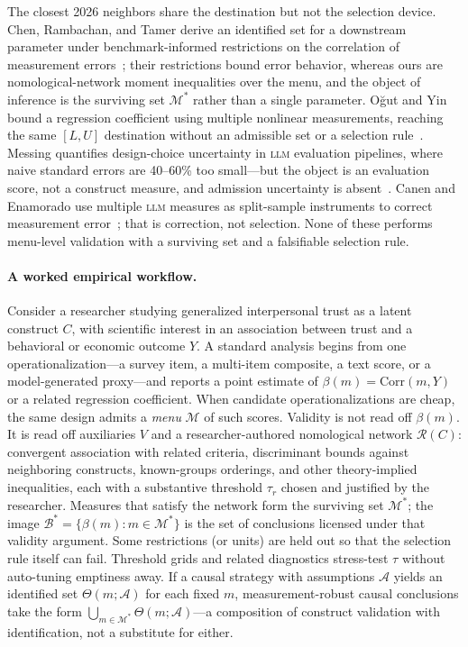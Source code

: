 \documentclass[10pt,letterpaper]{article}
\newcommand{\LLM}{\textsc{llm}}
\newcommand{\M}{\ensuremath{\mathcal{M}}}
\newcommand{\Rset}{\mathcal{R}}
\newcommand{\Bset}{\mathcal{B}}
\begin{document}
The closest 2026 neighbors share the destination but not the selection device.
Chen, Rambachan, and Tamer derive an identified set for a downstream parameter under benchmark-informed restrictions on the correlation of measurement errors~\cite{chenrttamer2026}; their restrictions bound error behavior, whereas ours are nomological-network moment inequalities over the menu, and the object of inference is the surviving set $\M^*$ rather than a single parameter.
O\u{g}ut and Yin bound a regression coefficient using multiple nonlinear measurements, reaching the same $[L,U]$ destination without an admissible set or a selection rule~\cite{ogutyin2026}.
Messing quantifies design-choice uncertainty in \LLM{} evaluation pipelines, where naive standard errors are 40--60\% too small---but the object is an evaluation score, not a construct measure, and admission uncertainty is absent~\cite{messing2026}.
Canen and Enamorado use multiple \LLM{} measures as split-sample instruments to correct measurement error~\cite{canenenamorado2026}; that is correction, not selection.
None of these performs menu-level validation with a surviving set and a falsifiable selection rule.

\paragraph{A worked empirical workflow.}
Consider a researcher studying generalized interpersonal trust as a latent construct $C$, with scientific interest in an association between trust and a behavioral or economic outcome $Y$.
A standard analysis begins from one operationalization---a survey item, a multi-item composite, a text score, or a model-generated proxy---and reports a point estimate of $\beta(m)=\mathrm{Corr}(m,Y)$ or a related regression coefficient.
When candidate operationalizations are cheap, the same design admits a \emph{menu} $\M$ of such scores.
Validity is not read off $\beta(m)$.
It is read off auxiliaries $V$ and a researcher-authored nomological network $\Rset(C)$: convergent association with related criteria, discriminant bounds against neighboring constructs, known-groups orderings, and other theory-implied inequalities, each with a substantive threshold $\tau_r$ chosen and justified by the researcher.
Measures that satisfy the network form the surviving set $\M^*$; the image $\Bset^*=\{\beta(m):m\in\M^*\}$ is the set of conclusions licensed under that validity argument.
Some restrictions (or units) are held out so that the selection rule itself can fail.
Threshold grids and related diagnostics stress-test $\tau$ without auto-tuning emptiness away.
If a causal strategy with assumptions $\mathcal{A}$ yields an identified set $\Theta(m;\mathcal{A})$ for each fixed $m$, measurement-robust causal conclusions take the form $\bigcup_{m\in\M^*}\Theta(m;\mathcal{A})$---a composition of construct validation with identification, not a substitute for either.
\end{document}
